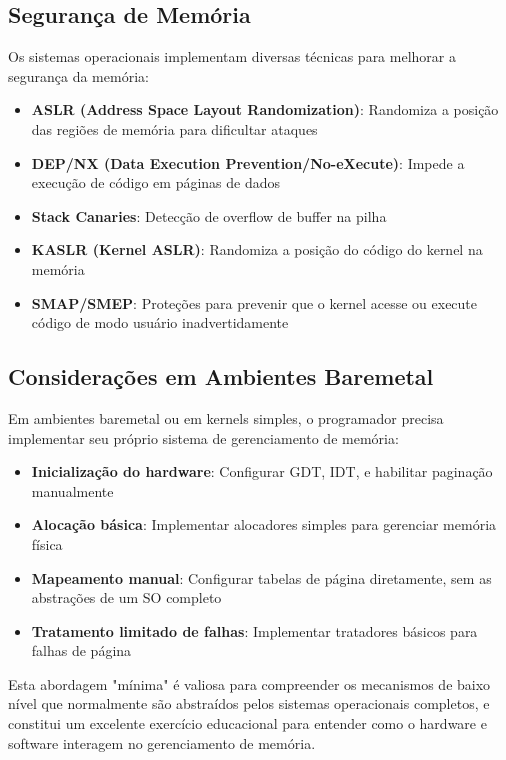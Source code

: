 \subsection{Segurança de Memória}
\label{subsec:seguranca_memoria}

Os sistemas operacionais implementam diversas técnicas para melhorar a segurança da memória:

\begin{itemize}
    \item \textbf{ASLR (Address Space Layout Randomization)}: Randomiza a posição das regiões de memória para dificultar ataques

    \item \textbf{DEP/NX (Data Execution Prevention/No-eXecute)}: Impede a execução de código em páginas de dados

    \item \textbf{Stack Canaries}: Detecção de overflow de buffer na pilha

    \item \textbf{KASLR (Kernel ASLR)}: Randomiza a posição do código do kernel na memória

    \item \textbf{SMAP/SMEP}: Proteções para prevenir que o kernel acesse ou execute código de modo usuário inadvertidamente
\end{itemize}

\subsection{Considerações em Ambientes Baremetal}
\label{subsec:baremetal_so}

Em ambientes baremetal ou em kernels simples, o programador precisa implementar seu próprio sistema de gerenciamento de memória:

\begin{itemize}
    \item \textbf{Inicialização do hardware}: Configurar GDT, IDT, e habilitar paginação manualmente

    \item \textbf{Alocação básica}: Implementar alocadores simples para gerenciar memória física

    \item \textbf{Mapeamento manual}: Configurar tabelas de página diretamente, sem as abstrações de um SO completo

    \item \textbf{Tratamento limitado de falhas}: Implementar tratadores básicos para falhas de página
\end{itemize}

Esta abordagem "mínima" é valiosa para compreender os mecanismos de baixo nível que normalmente são abstraídos pelos sistemas operacionais completos, e constitui um excelente exercício educacional para entender como o hardware e software interagem no gerenciamento de memória.

